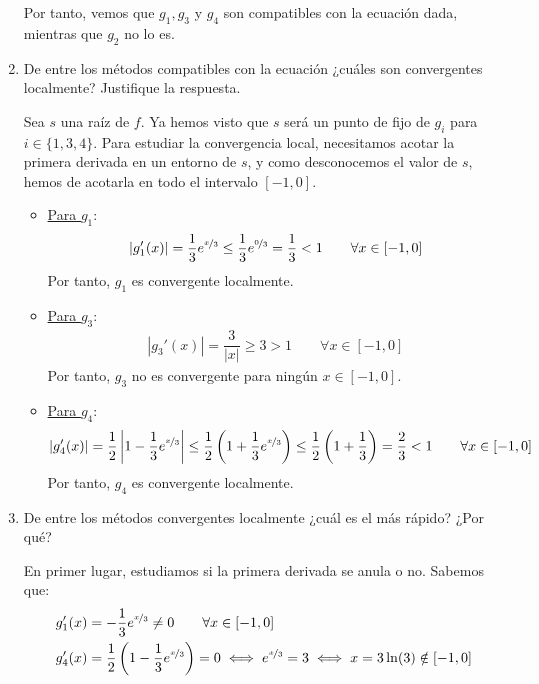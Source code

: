 \begin{ejercicio}
\begin{enumerate}
        Por tanto, vemos que $g_1, g_3$ y $g_4$ son compatibles con la ecuación dada, mientras que $g_2$ no lo es.
        \item De entre los métodos compatibles con la ecuación ¿cuáles son convergentes localmente? Justifique la respuesta.
        
        Sea $s$ una raíz de $f$. Ya hemos visto que $s$ será un punto de fijo de $g_i$ para $i\in\{1,3,4\}$. Para estudiar la convergencia local, necesitamos acotar la primera derivada en un entorno de $s$, y como desconocemos el valor de $s$, hemos de acotarla en todo el intervalo $[-1,0]$.
        \begin{itemize}
            \item \ul{Para $g_1$}:
            \begin{align*}
                |g_1'(x)|=\dfrac{1}{3}e^{\nicefrac{x}{3}}\leq \dfrac{1}{3}e^{\nicefrac{0}{3}}=\dfrac{1}{3}<1\qquad \forall x\in [-1,0]
            \end{align*}
            Por tanto, $g_1$ es convergente localmente.

            \item \ul{Para $g_3$}:
            \begin{align*}
                |g_3'(x)|=\dfrac{3}{|x|}\geq 3>1\qquad \forall x\in [-1,0]
            \end{align*}
            Por tanto, $g_3$ no es convergente para ningún $x\in [-1,0]$.

            \item \ul{Para $g_4$}:
            \begin{align*}
                |g_4'(x)|=\dfrac{1}{2}\left|1-\dfrac{1}{3}e^{\nicefrac{x}{3}}\right|\leq \dfrac{1}{2}\left(1+\dfrac{1}{3}e^{\nicefrac{x}{3}}\right)\leq\dfrac{1}{2}\left(1+\dfrac{1}{3}\right)=\dfrac{2}{3}<1\qquad \forall x\in [-1,0]
            \end{align*}
            Por tanto, $g_4$ es convergente localmente.
        \end{itemize}
        \item De entre los métodos convergentes localmente ¿cuál es el más rápido? ¿Por qué?
        
        En primer lugar, estudiamos si la primera derivada se anula o no. Sabemos que:
        \begin{align*}
            g_1'(x)&=-\dfrac{1}{3}e^{\nicefrac{x}{3}}\neq 0\qquad \forall x\in [-1,0]\\
            g_4'(x)&=\dfrac{1}{2}\left(1-\dfrac{1}{3}e^{\nicefrac{x}{3}}\right)=0\iff e^{\nicefrac{x}{3}}=3\iff x=3\ln(3)\notin [-1,0]
        \end{align*}


\end{enumerate}
\end{ejercicio}
